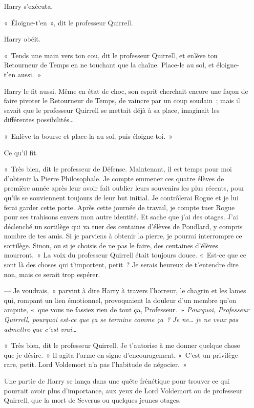 Harry s'exécuta.

«~Éloigne-t'en~», dit le professeur Quirrell.

Harry obéit.

«~Tends une main vers ton cou, dit le professeur Quirrell, et enlève ton Retourneur de Temps en ne touchant que la chaîne. Place-le au sol, et éloigne-t'en aussi.~»

Harry le fit aussi. Même en état de choc, son esprit cherchait encore une façon de faire pivoter le Retourneur de Temps, de vaincre par un coup soudain~; mais il savait que le professeur Quirrell se mettait déjà à sa place, imaginait les différentes possibilités…

«~Enlève ta bourse et place-la au sol, puis éloigne-toi.~»

Ce qu'il fit.

«~Très bien, dit le professeur de Défense. Maintenant, il est temps pour moi d'obtenir la Pierre Philosophale. Je compte emmener ces quatre élèves de première année après leur avoir fait oublier leurs souvenirs les plus récents, pour qu'ils se souviennent toujours de leur but initial. Je contrôlerai Rogue et je lui ferai garder cette porte. Après cette journée de travail, je compte tuer Rogue pour ses trahisons envers mon autre identité. Et sache que j'ai des otages. J'ai déclenché un sortilège qui va tuer des centaines d'élèves de Poudlard, y compris nombre de tes amis. Si je parviens à obtenir la pierre, je pourrai interrompre ce sortilège. Sinon, ou si je choisis de ne pas le faire, des centaines d'élèves mourront.~» La voix du professeur Quirrell était toujours douce. «~Est-ce que ce sont là des choses qui t'importent, petit~? Je serais heureux de t'entendre dire non, mais ce serait trop espérer.

--- Je voudrais,~» parvint à dire Harry à travers l'horreur, le chagrin et les lames qui, rompant un lien émotionnel, provoquaient la douleur d'un membre qu'on ampute, «~que vous ne fassiez rien de tout ça, Professeur.~» \emph{Pourquoi, Professeur Quirrell, pourquoi est-ce que ça se termine comme ça~? Je ne… je ne veux pas admettre que c'est vrai…}

«~Très bien, dit le professeur Quirrell. Je t'autorise à me donner quelque chose que je désire.~» Il agita l'arme en signe d'encouragement. «~C'est un privilège rare, petit. Lord Voldemort n'a pas l'habitude de négocier.~»

Une partie de Harry se lança dans une quête frénétique pour trouver ce qui pourrait avoir plus d'importance, aux yeux de Lord Voldemort ou de professeur Quirrell, que la mort de Severus ou quelques jeunes otages.


